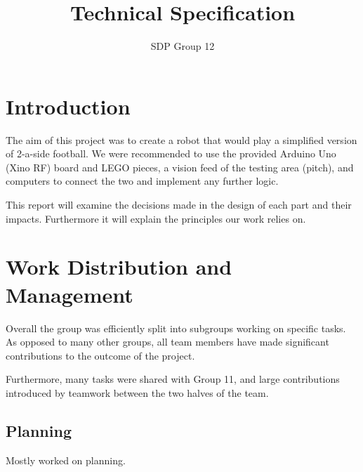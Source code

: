 \documentclass[12pt,a4paper,titlepage]{article}
\author{SDP Group 12}
\title{Technical Specification}
\begin{document}
\maketitle




\section{Introduction}

The aim of this project was to create a robot that would play a simplified version of 2-a-side football. We were recommended to use the provided Arduino Uno (Xino RF) board and LEGO pieces, a vision feed of the testing area (pitch), and computers to connect the two and implement any further logic.

This report will examine the decisions made in the design of each part and their impacts. Furthermore it will explain the principles our work relies on.


\section{Work Distribution and Management}
Overall the group was efficiently split into subgroups working on specific tasks. As opposed to many other groups, all team members have made significant contributions to the outcome of the project.

Furthermore, many tasks were shared with Group 11, and large contributions introduced by teamwork between the two halves of the team.


\subsection{Planning}
Mostly worked on planning.
\end{document}
